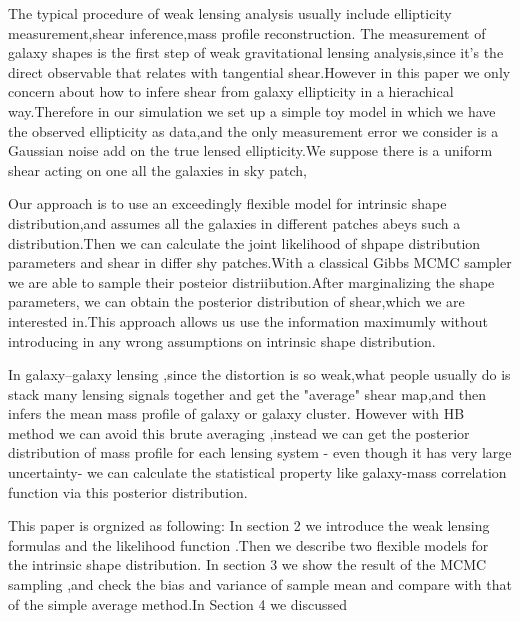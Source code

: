 \documentclass[useAMS,usenatbib]{mn2e}
\begin{document}
The typical procedure of weak lensing analysis usually include ellipticity measurement,shear inference,mass profile reconstruction.
The measurement of galaxy shapes  is  the first step  of weak gravitational lensing analysis,since it's the direct observable
that relates with tangential shear.However in this paper we only concern about how to infere shear from galaxy ellipticity
in a hierachical way.Therefore in our simulation we set up a simple toy model in which we have the observed ellipticity as data,and the only measurement error we consider 
is a Gaussian noise add on the true lensed ellipticity.We suppose there is a uniform shear acting on one all the galaxies in sky patch,


Our approach is to use an exceedingly flexible model for intrinsic shape distribution,and assumes all the galaxies in different
patches abeys such a distribution.Then we can calculate the joint likelihood of  shpape distribution parameters and shear in differ
shy patches.With a classical Gibbs MCMC sampler we are able to sample their posteior distriibution.After marginalizing the shape parameters, we can
obtain the posterior distribution of shear,which we are interested in.This approach allows us use the information maximumly
without introducing in any wrong assumptions on intrinsic shape distribution.


In galaxy--galaxy lensing ,since the distortion is so weak,what people usually do is stack many lensing signals together and get the "average"
shear map,and then infers the mean mass profile of galaxy or galaxy cluster.
However with HB method we can avoid this brute averaging ,instead we can get the posterior distribution of mass profile for 
each lensing system - even though it has very large uncertainty- we can calculate the statistical property like galaxy-mass
correlation function via this posterior distribution.


This paper is orgnized as following: In section 2 we introduce the weak lensing formulas and the likelihood function .Then we 
describe two flexible models for the intrinsic shape distribution. In section 3 we show the result of the MCMC sampling
,and check the bias and variance of sample mean and compare with that of the simple average method.In Section 4 we discussed




\end{document}
